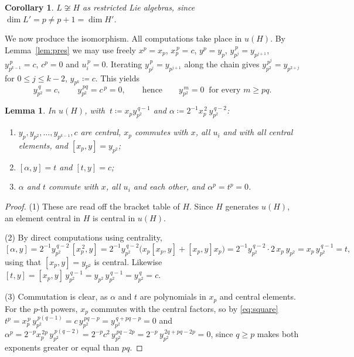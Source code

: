 \documentclass[11pt,reqno]{amsart}
\theoremstyle{plain}
\newtheorem{lemma}[theorem]{Lemma}
\newtheorem{corollary}[theorem]{Corollary}
\theoremstyle{remark}
\begin{document}
\begin{corollary}\label{cor:nonisop}
$L\not\cong H$ as restricted Lie algebras, since
$\dim L'=p\neq p+1=\dim H'$.
\end{corollary}

We now produce the isomorphism. All computations take place in $u(H)$. By
Lemma~\ref{lem:pres} we may use freely $x^p=x_p$,
$x_p^{\,p}=c$, $y^p=y_p$, $y_{p^j}^{\,p}=y_{p^{j+1}}$, $y_{p^{k-1}}^{\,p}=c$,
$c^p=0$ and $u_i^{\,p}=0$. Iterating $y_{p^j}^{\,p}=y_{p^{j+1}}$ along
the chain gives $y_{p^2}^{\,p^j}=y_{p^{2+j}}$ for $0\le j\le k-2$, $y_{p^k}\coloneqq c$. This yields
\begin{equation}\label{eq:tower}
y_{p^2}^{\,q}=c,\qquad y_{p^2}^{\,pq}=c^{\,p}=0,
\qquad\text{hence}\qquad
y_{p^2}^{\,m}=0\ \text{ for every } m\ge pq .
\end{equation}

\begin{lemma}\label{lem:toolp}
In $u(H)$, with $\ t\coloneqq x_p y_{p^2}^{\,q-1}$ and
$\alpha\coloneqq 2^{-1}x_p^{\,2}\,y_{p^2}^{\,q-2}$:
\begin{enumerate}
\item $y_p,y_{p^2},\dots,y_{p^{k-1}},c$ are central, $x_p$ commutes with $x$,
      all $u_i$ and with all central elements, and $[x_p,y]=y_{p^2}$;
\item $[\alpha,y]=t$ and $[t,y]=c$;
\item $\alpha$ and $t$ commute with $x$, all $u_i$ and each other, and
      $\alpha^p=t^p=0$.
\end{enumerate}
\end{lemma}

\begin{proof}
(1) These are read off the bracket table of $H$. Since
$H$ generates $u(H)$, an element central in $H$ is central in $u(H)$.

(2) By direct computations using centrality,
\[
[\alpha,y]=2^{-1}y_{p^2}^{\,q-2}\,[x_p^{\,2},y]
=2^{-1}y_{p^2}^{\,q-2}\bigl(x_p[x_p,y]+[x_p,y]x_p\bigr)
=2^{-1}y_{p^2}^{\,q-2}\cdot2\,x_p\,y_{p^2}=x_p\,y_{p^2}^{\,q-1}=t,
\]
using that $[x_p,y]=y_{p^2}$ is central. Likewise $[t,y]=[x_p,y]\,y_{p^2}^{\,q-1}
=y_{p^2}\, y_{p^2}^{\,q-1}=y_{p^2}^{\,q}=c$.

(3) Commutation is clear, as $\alpha$ and $t$ are polynomials in
$x_p$ and central elements. For the $p$-th powers, $x_p$ commutes with the
central factors, so by \eqref{eq:square}
$t^p=x_p^{\,p}\,y_{p^2}^{\,p(q-1)}=c\,y_{p^2}^{\,pq-p}
=y_{p^2}^{\,q+pq-p}=0$ and
$\alpha^p=2^{-p}x_p^{\,2p}\,y_{p^2}^{\,p(q-2)}=2^{-p}c^2\,y_{p^2}^{\,pq-2p}
=2^{-p}\,y_{p^2}^{\,2q+pq-2p}=0$, since $q\ge p$ makes both exponents
greater or equal than $pq$.
\end{proof}
\end{document}
